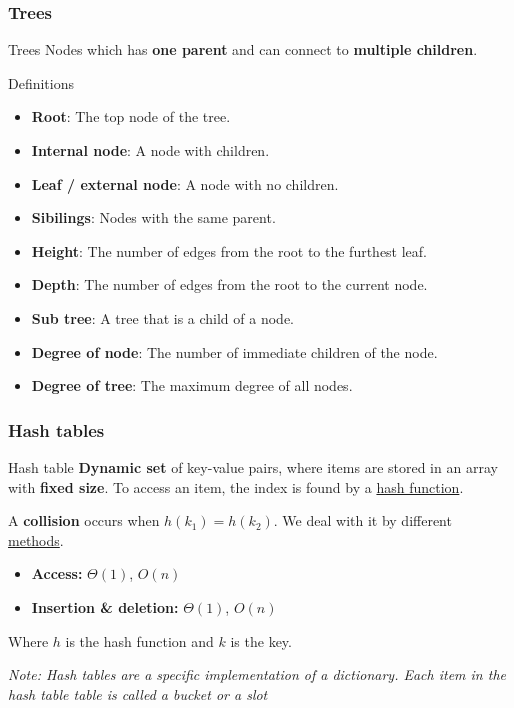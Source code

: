 \subsubsection{Trees}

\begin{definition}
    {Trees}
    Nodes which has \textbf{one parent} and can connect to \textbf{multiple children}.
\end{definition}

\begin{knBox}
    {Definitions}
    \begin{itemize}
        \item \textbf{Root}: The top node of the tree.
        \item \textbf{Internal node}: A node with children.
        \item \textbf{Leaf / external node}: A node with no children.
        \item \textbf{Sibilings}: Nodes with the same parent.
        \item \textbf{Height}: The number of edges from the root to the furthest leaf.
        \item \textbf{Depth}: The number of edges from the root to the current node.
              \item\textbf{Sub tree}: A tree that is a child of a node.
        \item \textbf{Degree of node}: The number of immediate children of the node.
        \item \textbf{Degree of tree}: The maximum degree of all nodes.
    \end{itemize}
\end{knBox}

\label{thm:graph_bfs}

\subsubsection{Hash tables}

\begin{definition}
    {Hash table}
    \textbf{Dynamic set} of key-value pairs, where items are stored in an array with \textbf{fixed size}. To access an item, the index is found by a \hyperref[thm:hash-function]{hash function}.

    A \textbf{collision} occurs when $h(k_1) = h(k_2)$. We deal with it by different \hyperref[thm:collision-resolution]{methods}.

    \begin{itemize}
        \item \textbf{Access:} $\Theta(1)$, $O(n)$
        \item \textbf{Insertion \& deletion:} $\Theta(1)$, $O(n)$
    \end{itemize}

    Where $h$ is the hash function and $k$ is the key.

    \textit{Note: Hash tables are a specific implementation of a dictionary. Each item in the hash table table is called a bucket or a slot}
\end{definition}

